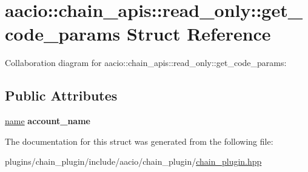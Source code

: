 \hypertarget{structaacio_1_1chain__apis_1_1read__only_1_1get__code__params}{}\section{aacio\+:\+:chain\+\_\+apis\+:\+:read\+\_\+only\+:\+:get\+\_\+code\+\_\+params Struct Reference}
\label{structaacio_1_1chain__apis_1_1read__only_1_1get__code__params}


Collaboration diagram for aacio\+:\+:chain\+\_\+apis\+:\+:read\+\_\+only\+:\+:get\+\_\+code\+\_\+params\+:
\subsection*{Public Attributes}
\begin{DoxyCompactItemize}
\item 
\mbox{\label{structaacio_1_1chain__apis_1_1read__only_1_1get__code__params_abba92e0917330dc4ebd6b4ce25f57d04}} 
\mbox{\hyperlink{structaacio_1_1name}{name}} {\bfseries account\+\_\+name}
\end{DoxyCompactItemize}


The documentation for this struct was generated from the following file\+:\begin{DoxyCompactItemize}
\item 
plugins/chain\+\_\+plugin/include/aacio/chain\+\_\+plugin/\mbox{\hyperlink{chain__plugin_8hpp}{chain\+\_\+plugin.\+hpp}}\end{DoxyCompactItemize}

